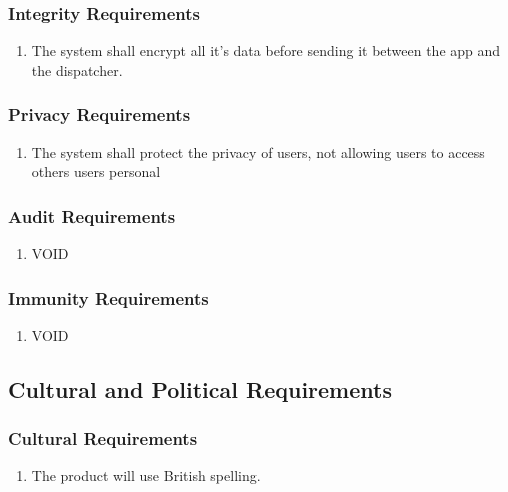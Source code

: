 \documentclass[english]{article}
\begin{document}
\subsubsection{Integrity Requirements}
\label{ssub:integrity_requirements}
\begin{enumerate}[{SIR}1. ]
	\item The system shall encrypt all it's data before sending it between the app and the dispatcher. 
\end{enumerate}

\subsubsection{Privacy Requirements}
\label{ssub:privacy_requirements}
\begin{enumerate}[{SPR}1. ]
	\item The system shall protect the privacy of users, not allowing users to access others users personal
\end{enumerate}

\subsubsection{Audit Requirements}
\label{ssub:audit_requirements}
\begin{enumerate}[{SAUR}1. ]
	\item VOID
\end{enumerate}

\subsubsection{Immunity Requirements}
\label{ssub:immunity_requirements}
\begin{enumerate}[{SIMR}1. ]
	\item VOID
\end{enumerate}


\subsection{Cultural and Political Requirements}
\label{sub:cultural_and_political_requirements}

\subsubsection{Cultural Requirements}
\label{ssub:cultural_requirements}
\begin{enumerate}[{CCR}1. ]
	\item The product will use British spelling.
\end{enumerate}
\end{document}
